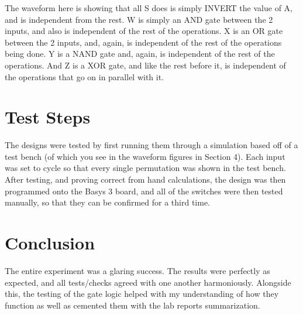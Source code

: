 \documentclass{article}
\begin{document}
The waveform here is showing that all S does is simply INVERT the value of A, and is independent from the rest. W is simply an AND gate between the 2 inputs, and also is independent of the rest of the operations. X is an OR gate between the 2 inputs, and, again, is independent of the rest of the operations being done. Y is a NAND gate and, again, is independent of the rest of the operations. And Z is a XOR gate, and like the rest before it, is independent of the operations that go on in parallel with it.
\section{Test Steps}
The designs were tested by first running them through a simulation based off of a test bench (of which you see in the waveform figures in Section 4). Each input was set to cycle so that every single permutation was shown in the test bench. After testing, and proving correct from hand calculations, the design was then programmed onto the Basys 3 board, and all of the switches were then tested manually, so that they can be confirmed for a third time.
\section{Conclusion}
The entire experiment was a glaring success. The results were perfectly as expected, and all tests/checks agreed with one another harmoniously. Alongside this, the testing of the gate logic helped with my understanding of how they function as well as cemented them with the lab reports summarization.
\end{document}
